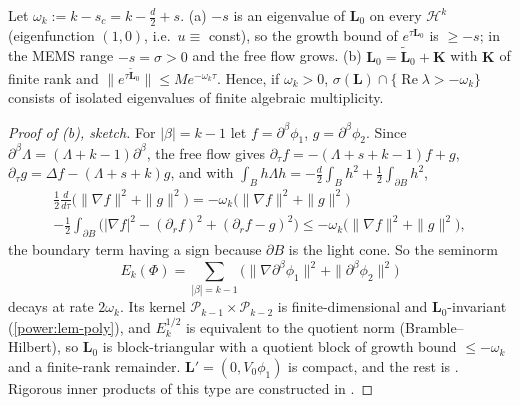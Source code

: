 \begin{lemma}\label{power:lem-free}
Let $\omega_k:=k-s_c=k-\frac d2+s$. (a) $-s$ is an eigenvalue of $\mathbf L_0$ on
every $\mathcal H^k$ (eigenfunction $(1,0)$, i.e.\ $u\equiv$ const), so the growth
bound of $e^{\tau\mathbf L_0}$ is $\ge-s$; in the MEMS range $-s=\sigma>0$ and the
free flow grows. (b) $\mathbf L_0=\tilde{\mathbf L}_0+\mathbf K$ with $\mathbf K$ of finite
rank and $\|e^{\tau\tilde{\mathbf L}_0}\|\le Me^{-\omega_k\tau}$. Hence, if $\omega_k>0$,
$\sigma(\mathbf L)\cap\{\operatorname{Re}\lambda>-\omega_k\}$ consists of isolated
eigenvalues of finite algebraic multiplicity.
\end{lemma}
\begin{proof}[Proof of (b), sketch]
For $|\beta|=k-1$ let $f=\partial^\beta\phi_1$, $g=\partial^\beta\phi_2$. Since
$\partial^\beta\Lambda=(\Lambda+k-1)\partial^\beta$, the free flow gives
$\partial_\tau f=-(\Lambda+s+k-1)f+g$, $\partial_\tau g=\Delta f-(\Lambda+s+k)g$, and
with $\int_B h\Lambda h=-\frac d2\int_Bh^2+\frac12\int_{\partial B}h^2$,
\begin{multline*}
  \tfrac12\tfrac{d}{d\tau}\bigl(\|\nabla f\|^2+\|g\|^2\bigr)
  =-\omega_k\bigl(\|\nabla f\|^2+\|g\|^2\bigr)\\
  -\tfrac12\int_{\partial B}\bigl(|\nabla f|^2-(\partial_rf)^2+(\partial_rf-g)^2\bigr)
  \le-\omega_k\bigl(\|\nabla f\|^2+\|g\|^2\bigr),
\end{multline*}
the boundary term having a sign because $\partial B$ is the light cone. So the
seminorm
\[
  E_k(\Phi)=\textstyle\sum_{|\beta|=k-1}\bigl(\|\nabla\partial^\beta\phi_1\|^2+\|\partial^\beta\phi_2\|^2\bigr)
\]
decays at rate $2\omega_k$. Its kernel $\mathcal P_{k-1}\times\mathcal P_{k-2}$ is
finite-dimensional and $\mathbf L_0$-invariant (\cref{power:lem-poly}), and
$E_k^{1/2}$ is equivalent to the quotient norm (Bramble--Hilbert), so $\mathbf L_0$
is block-triangular with a quotient block of growth bound $\le-\omega_k$ and a
finite-rank remainder. $\mathbf L'=(0,V_0\phi_1)$ is compact, and the rest is
\cite[Ch.~IV]{EngelNagel2000}. Rigorous inner products of this type are
constructed in \cite{Ostermann2024,Glogic2025}.
\end{proof}

